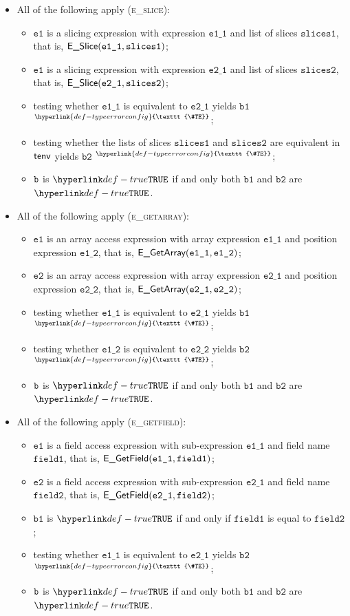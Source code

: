 \documentclass{book}
\newcommand\TypeErrorConfig[0]{\hyperlink{def-typeerrorconfig}{\texttt{\#TE}}}
\newcommand\ProseOrTypeError[0]{\hyperlink{def-proseortypeerror}{$^{\TypeErrorConfig}$}}
\newcommand\veone[0]{\texttt{e1}}
\newcommand\vetwo[0]{\texttt{e2}}
\newcommand\vfieldone[0]{\texttt{field1}}
\newcommand\vfieldtwo[0]{\texttt{field2}}
\newcommand\veoneone[0]{\texttt{e1\_1}}
\newcommand\veonetwo[0]{\texttt{e1\_2}}
\newcommand\vetwoone[0]{\texttt{e2\_1}}
\newcommand\vetwotwo[0]{\texttt{e2\_2}}
\newcommand\vbone[0]{\texttt{b1}}
\newcommand\vbtwo[0]{\texttt{b2}}
\newcommand\slicesone[0]{\texttt{slices1}}
\newcommand\slicestwo[0]{\texttt{slices2}}
\begin{document}
\begin{itemize}
  \item All of the following apply (\textsc{e\_slice}):
  \begin{itemize}
    \item $\veone$ is a slicing expression with expression $\veoneone$ and list of slices $\slicesone$,
          that is, $\ESlice(\veoneone, \slicesone)$;
    \item $\veone$ is a slicing expression with expression $\vetwoone$ and list of slices $\slicestwo$,
          that is, $\ESlice(\vetwoone, \slicestwo)$;
    \item testing whether $\veoneone$ is equivalent to $\vetwoone$ yields $\vbone$ \ProseOrTypeError;
    \item testing whether the lists of slices $\slicesone$ and $\slicestwo$ are equivalent in $\textsf{tenv}$ yields $\vbtwo$ \ProseOrTypeError;
    \item $\texttt{b}$ is $\True$ if and only both $\vbone$ and $\vbtwo$ are $\True$.
  \end{itemize}

  \item All of the following apply (\textsc{e\_getarray}):
  \begin{itemize}
    \item $\veone$ is an array access expression with array expression $\veoneone$ and position expression $\veonetwo$,
          that is, $\EGetArray(\veoneone, \veonetwo)$;
    \item $\vetwo$ is an array access expression with array expression $\vetwoone$ and position expression $\vetwotwo$,
          that is, $\EGetArray(\vetwoone, \vetwotwo)$;
    \item testing whether $\veoneone$ is equivalent to $\vetwoone$ yields $\vbone$ \ProseOrTypeError;
    \item testing whether $\veonetwo$ is equivalent to $\vetwotwo$ yields $\vbtwo$ \ProseOrTypeError;
    \item $\texttt{b}$ is $\True$ if and only both $\vbone$ and $\vbtwo$ are $\True$.
  \end{itemize}

  \item All of the following apply (\textsc{e\_getfield}):
  \begin{itemize}
    \item $\veone$ is a field access expression with sub-expression $\veoneone$ and field name $\vfieldone$,
          that is, $\EGetField(\veoneone, \vfieldone)$;
    \item $\vetwo$ is a field access expression with sub-expression $\vetwoone$ and field name $\vfieldtwo$,
          that is, $\EGetField(\vetwoone, \vfieldtwo)$;
    \item $\vbone$ is $\True$ if and only if $\vfieldone$ is equal to $\vfieldtwo$;
    \item testing whether $\veoneone$ is equivalent to $\vetwoone$ yields $\vbtwo$ \ProseOrTypeError;
    \item $\texttt{b}$ is $\True$ if and only both $\vbone$ and $\vbtwo$ are $\True$.
  \end{itemize}


\end{itemize}
\end{document}

